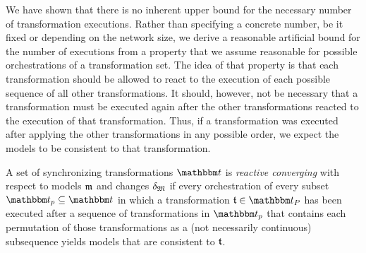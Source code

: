 We have shown that there is no inherent upper bound for the necessary number of transformation executions.
Rather than specifying a concrete number, be it fixed or depending on the network size, we derive a reasonable artificial bound for the number of executions from a property that we assume reasonable for possible orchestrations of a transformation set.
The idea of that property is that each transformation should be allowed to react to the execution of each possible sequence of all other transformations.
It should, however, not be necessary that a transformation must be executed again after the other transformations reacted to the execution of that transformation.
Thus, if a transformation was executed after applying the other transformations in any possible order, we expect the models to be consistent to that transformation.

\begin{definition}
    \label{def:reactiveconverging}
    A set of synchronizing transformations $\transformationset{T}$ is \emph{reactive converging} with respect to models $\modeltuple{m}$ and changes $\changetuple{\metamodeltuple{M}}$ if every orchestration of every subset $\transformationset{T}_p \subseteq \transformationset{T}$ in which a transformation $\transformation{t} \in \transformationset{T}_P$ has been executed after a sequence of transformations in $\transformationset{T}_p$ that contains each permutation of those transformations as a (not necessarily continuous) subsequence yields models that are consistent to $\transformation{t}$.
\end{definition}

